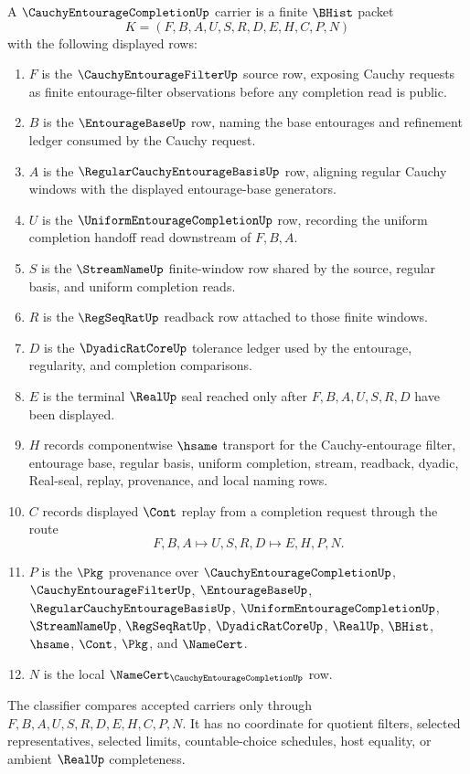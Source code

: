 \begin{definition}
\label{def:cauchy-entourage-completion-carrier}
A $\CauchyEntourageCompletionUp$ carrier is a finite $\BHist$ packet
$$
K=(F,B,A,U,S,R,D,E,H,C,P,N)
$$
with the following displayed rows:
\begin{enumerate}
\item $F$ is the $\CauchyEntourageFilterUp$ source row, exposing Cauchy requests
as finite entourage-filter observations before any completion read is public.
\item $B$ is the $\EntourageBaseUp$ row, naming the base entourages and
refinement ledger consumed by the Cauchy request.
\item $A$ is the $\RegularCauchyEntourageBasisUp$ row, aligning regular Cauchy
windows with the displayed entourage-base generators.
\item $U$ is the $\UniformEntourageCompletionUp$ row, recording the uniform
completion handoff read downstream of $F,B,A$.
\item $S$ is the $\StreamNameUp$ finite-window row shared by the source,
regular basis, and uniform completion reads.
\item $R$ is the $\RegSeqRatUp$ readback row attached to those finite windows.
\item $D$ is the $\DyadicRatCoreUp$ tolerance ledger used by the entourage,
regularity, and completion comparisons.
\item $E$ is the terminal $\RealUp$ seal reached only after $F,B,A,U,S,R,D$
have been displayed.
\item $H$ records componentwise $\hsame$ transport for the Cauchy-entourage
filter, entourage base, regular basis, uniform completion, stream, readback,
dyadic, Real-seal, replay, provenance, and local naming rows.
\item $C$ records displayed $\Cont$ replay from a completion request through
the route
$$
F,B,A \longmapsto U,S,R,D \longmapsto E,H,P,N .
$$
\item $P$ is the $\Pkg$ provenance over $\CauchyEntourageCompletionUp$,
$\CauchyEntourageFilterUp$, $\EntourageBaseUp$,
$\RegularCauchyEntourageBasisUp$, $\UniformEntourageCompletionUp$,
$\StreamNameUp$, $\RegSeqRatUp$, $\DyadicRatCoreUp$, $\RealUp$, $\BHist$,
$\hsame$, $\Cont$, $\Pkg$, and $\NameCert$.
\item $N$ is the local $\NameCert_{\CauchyEntourageCompletionUp}$ row.
\end{enumerate}
The classifier compares accepted carriers only through
$F,B,A,U,S,R,D,E,H,C,P,N$. It has no coordinate for quotient filters, selected
representatives, selected limits, countable-choice schedules, host equality,
or ambient $\RealUp$ completeness.
\end{definition}

